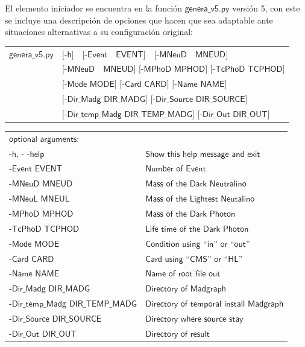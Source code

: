 El elemento iniciador se encuentra en la función $\textsf{genera\_v5.py}$ versión 5, con este se incluye una descripción de opciones que hacen que sea adaptable ante situaciones alternativas a su configuración original:

\begin{tabular}{|ll|}
\hline
$\textsf{genera\_v5.py}$  & $\textsf{[-h] ~ [-Event ~ EVENT] ~ [-MNeuD ~ MNEUD]}$\\
& $\textsf{[-MNeuD ~ MNEUD] [-MPhoD MPHOD] [-TcPhoD TCPHOD]}$\\
& $\textsf{[-Mode MODE] [-Card CARD] [-Name NAME]}$\\
& $\textsf{[-Dir\_Madg DIR\_MADG] [-Dir\_Source DIR\_SOURCE]}$\\
& $\textsf{[-Dir\_temp\_Madg DIR\_TEMP\_MADG] [-Dir\_Out DIR\_OUT]}$ \\
\hline
\end{tabular}%

\begin{tabular}{|ll|}
\hline
$\textsf{optional arguments:}$  & \\
$\textsf{-h, - -help}$          & $\textsf{Show this help message and exit}$\\
$\textsf{-Event EVENT}$         & $\textsf{Number of Event}$\\
$\textsf{-MNeuD MNEUD}$         & $\textsf{Mass of the Dark Neutralino}$\\
$\textsf{-MNeuL MNEUL}$         & $\textsf{Mass of the Lightest Neutalino}$\\
$\textsf{-MPhoD MPHOD}$         & $\textsf{Mass of the Dark Photon}$\\
$\textsf{-TcPhoD TCPHOD}$       & $\textsf{Life time of the Dark Photon}$\\
$\textsf{-Mode MODE}$           & $\textsf{Condition using ``in'' or ``out''}$\\
$\textsf{-Card CARD}$           & $\textsf{Card using ``CMS'' or ``HL''}$\\
$\textsf{-Name NAME}$           & $\textsf{Name of root file out}$\\
$\textsf{-Dir\_Madg DIR\_MADG}$     & $\textsf{Directory of Madgraph}$\\
$\textsf{-Dir\_temp\_Madg DIR\_TEMP\_MADG}$ & $\textsf{Directory of temporal install Madgraph}$\\
$\textsf{-Dir\_Source DIR\_SOURCE}$ & $\textsf{Directory where source stay}$\\
$\textsf{-Dir\_Out DIR\_OUT}$ & $\textsf{Directory of result}$\\
\hline
\end{tabular}\\

